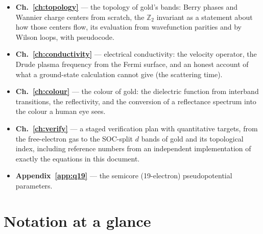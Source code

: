 \begin{itemize}[leftmargin=2em]
layouts, batching over $\kk$ and bands, FFT strategy, mixed precision,
JIT-compatible control flow, and memory budgeting.
\item \textbf{Ch.~\ref{ch:topology}} --- the topology of gold's bands:
Berry phases and Wannier charge centers from scratch, the $\mathbb{Z}_2$
invariant as a statement about how those centers flow, its evaluation from
wavefunction parities and by Wilson loops, with pseudocode.
\item \textbf{Ch.~\ref{ch:conductivity}} --- electrical conductivity: the
velocity operator, the Drude plasma frequency from the Fermi surface, and
an honest account of what a ground-state calculation cannot give (the
scattering time).
\item \textbf{Ch.~\ref{ch:colour}} --- the colour of gold: the dielectric
function from interband transitions, the reflectivity, and the conversion
of a reflectance spectrum into the colour a human eye sees.
\item \textbf{Ch.~\ref{ch:verify}} --- a staged verification plan with
quantitative targets, from the free-electron gas to the SOC-split $d$ bands
of gold and its topological index, including reference numbers from an
independent implementation of exactly the equations in this document.
\item \textbf{Appendix~\ref{app:q19}} --- the semicore (19-electron)
pseudopotential parameters.
\end{itemize}

\section{Notation at a glance}
\label{sec:notation}

